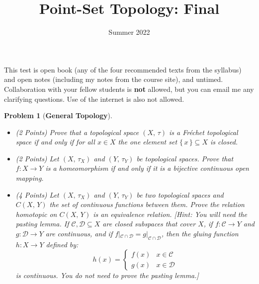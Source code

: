 \documentclass{article}
\title{Point-Set Topology: Final}
\date{Summer 2022}
\theoremstyle{normal}
\newtheorem{problem}{Problem}
\begin{document}
    \maketitle
    This test is open book (any of the four recommended texts from the syllabus)
    and open notes (including my notes from the course site), and untimed.
    Collaboration with your fellow students is \textbf{not} allowed, but you
    can email me any clarifying questions. Use of the internet is also not
    allowed.
    \begin{problem}[\textbf{General Topology}]
        \par\hfill\par\vspace{2em}
        \begin{itemize}
            \item
            (2 Points)
            Prove that a topological space $(X,\,\tau)$ is a
            Fr\'{e}chet topological space if and only if for all $x\in{X}$ the
            one element set $\{\,x\,\}\subseteq{X}$ is closed.
            \item
            (2 Points)
            Let $(X,\,\tau_{X})$ and $(Y,\,\tau_{Y})$ be topological spaces.
            Prove that $f:X\rightarrow{Y}$ is a homeomorphism if and only if
            it is a bijective continuous open mapping.
            \item
            (4 Points) Let $(X,\,\tau_{X})$ and $(Y,\,\tau_{Y})$ be two
            topological spaces and $C(X,\,Y)$ the set of continuous functions
            between them. Prove the relation \textit{homotopic} on $C(X,\,Y)$
            is an equivalence relation. [Hint: You will need the pasting lemma.
            If $\mathcal{C},\mathcal{D}\subseteq{X}$ are closed subspaces that
            cover $X$, if $f:\mathcal{C}\rightarrow{Y}$ and
            $g:\mathcal{D}\rightarrow{Y}$ are continuous, and if
            $f|_{\mathcal{C}\cap\mathcal{D}}=g|_{\mathcal{C}\cap\mathcal{D}}$,
            then the \textit{gluing} function $h:X\rightarrow{Y}$ defined by:
            \begin{equation}
                h(x)=
                \begin{cases}
                    f(x)&x\in\mathcal{C}\\
                    g(x)&x\in\mathcal{D}
                \end{cases}
            \end{equation}
            is continuous. You do not need to prove the pasting lemma.]
        \end{itemize}
    \end{problem}
\end{document}
